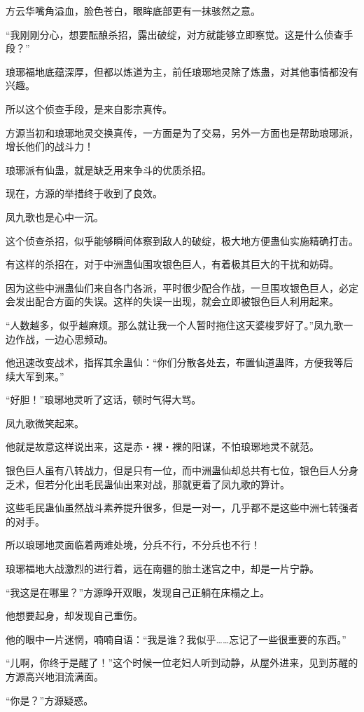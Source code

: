 \begin{this_body}
方云华嘴角溢血，脸色苍白，眼眸底部更有一抹骇然之意。

“我刚刚分心，想要酝酿杀招，露出破绽，对方就能够立即察觉。这是什么侦查手段？”

琅琊福地底蕴深厚，但都以炼道为主，前任琅琊地灵除了炼蛊，对其他事情都没有兴趣。

所以这个侦查手段，是来自影宗真传。

方源当初和琅琊地灵交换真传，一方面是为了交易，另外一方面也是帮助琅琊派，增长他们的战斗力！

琅琊派有仙蛊，就是缺乏用来争斗的优质杀招。

现在，方源的举措终于收到了良效。

凤九歌也是心中一沉。

这个侦查杀招，似乎能够瞬间体察到敌人的破绽，极大地方便蛊仙实施精确打击。

有这样的杀招在，对于中洲蛊仙围攻银色巨人，有着极其巨大的干扰和妨碍。

因为这些中洲蛊仙们来自各门各派，平时很少配合作战，一旦围攻银色巨人，必定会发出配合方面的失误。这样的失误一出现，就会立即被银色巨人利用起来。

“人数越多，似乎越麻烦。那么就让我一个人暂时拖住这天婆梭罗好了。”凤九歌一边作战，一边心思频动。

他迅速改变战术，指挥其余蛊仙：“你们分散各处去，布置仙道蛊阵，方便我等后续大军到来。”

“好胆！”琅琊地灵听了这话，顿时气得大骂。

凤九歌微笑起来。

他就是故意这样说出来，这是赤・裸・裸的阳谋，不怕琅琊地灵不就范。

银色巨人虽有八转战力，但是只有一位，而中洲蛊仙却总共有七位，银色巨人分身乏术，但若分化出毛民蛊仙出来对战，那就更着了凤九歌的算计。

这些毛民蛊仙虽然战斗素养提升很多，但是一对一，几乎都不是这些中洲七转强者的对手。

所以琅琊地灵面临着两难处境，分兵不行，不分兵也不行！

琅琊福地大战激烈的进行着，远在南疆的胎土迷宫之中，却是一片宁静。

“我这是在哪里？”方源睁开双眼，发现自己正躺在床榻之上。

他想要起身，却发现自己重伤。

他的眼中一片迷惘，喃喃自语：“我是谁？我似乎……忘记了一些很重要的东西。”

“儿啊，你终于是醒了！”这个时候一位老妇人听到动静，从屋外进来，见到苏醒的方源高兴地泪流满面。

“你是？”方源疑惑。


\end{this_body}
